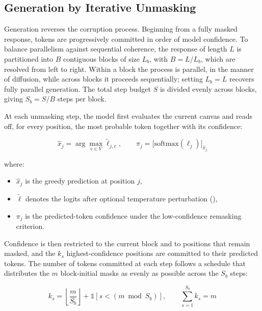 \documentclass[a4paper,twoside,12pt]{report}
\begin{document}
\subsection{Generation by Iterative Unmasking}

Generation reverses the corruption process. Beginning from a fully masked
response, tokens are progressively committed in order of model confidence. To
balance parallelism against sequential coherence, the response of length \(L\)
is partitioned into \(B\) contiguous blocks of size \(L_b\), with \(B = L /
L_b\), which are resolved from left to right. Within a block the process is
parallel, in the manner of diffusion, while across blocks it proceeds
sequentially; setting \(L_b = L\) recovers fully parallel generation. The total
step budget \(S\) is divided evenly across blocks, giving \(S_b = S/B\) steps
per block.

At each unmasking step, the model first evaluates the current canvas and reads
off, for every position, the most probable token together with its confidence:

\begin{equation}
\hat{x}_j = \arg\max_{v \in V} \tilde{\ell}_{j,v},
\qquad
\pi_j = \big[\mathrm{softmax}(\boldsymbol{\ell}_j)\big]_{\hat{x}_j}
\end{equation}

where:
\begin{itemize}
  \item \(\hat{x}_j\) is the greedy prediction at position \(j\),
  \item \(\tilde{\boldsymbol{\ell}}\) denotes the logits after optional
        temperature perturbation (),
  \item \(\pi_j\) is the predicted-token confidence under the low-confidence
        remasking criterion.
\end{itemize}

Confidence is then restricted to the current block and to positions that remain
masked, and the \(k_s\) highest-confidence positions are committed to their
predicted tokens. The number of tokens committed at each step follows a
schedule that distributes the \(m\) block-initial masks as evenly as possible
across the \(S_b\) steps:

\begin{equation}
k_s = \left\lfloor \frac{m}{S_b} \right\rfloor
      + \mathbb{1}\!\left[s < (m \bmod S_b)\right],
\qquad \sum_{s=1}^{S_b} k_s = m
\end{equation}
\end{document}
